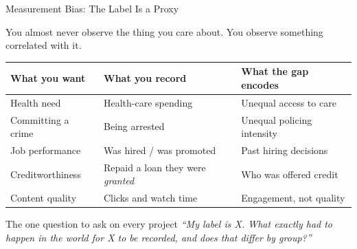 
\begin{frame}{Measurement Bias: The Label Is a Proxy}

    You almost never observe the thing you care about. You observe something correlated with it.

    \vspace{0.8em}
    \centering
    \small
    \begin{tabular}{p{3.9cm} p{4.0cm} p{4.0cm}}
        \toprule
        \textbf{What you want} & \textbf{What you record} & \textbf{What the gap encodes} \\
        \midrule
        Health need & Health-care spending & Unequal access to care \\
        \addlinespace
        Committing a crime & Being arrested & Unequal policing intensity \\
        \addlinespace
        Job performance & Was hired / was promoted & Past hiring decisions \\
        \addlinespace
        Creditworthiness & Repaid a loan they were \emph{granted} & Who was offered credit \\
        \addlinespace
        Content quality & Clicks and watch time & Engagement, not quality \\
        \bottomrule
    \end{tabular}

    \vspace{1em}
    \raggedright
    \begin{block}{The one question to ask on every project}
        \centering
        \textit{``My label is X. What exactly had to happen in the world for X to be recorded,
        and does that differ by group?''}
    \end{block}
\end{frame}
